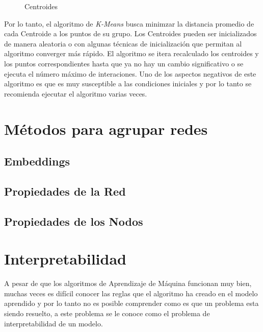  \begin{figure}[htbp]
   \centering
   
    \caption{Centroides}
    \label{fig:cengroides}
\end{figure}

Por lo tanto, el algoritmo de \textit{K-Means} busca minimzar la distancia promedio de cada Centroide a los puntos de su grupo. Los Centroides pueden ser inicializados de manera aleatoria o con algunas técnicas de inicialización que permitan al algoritmo converger más rápido. El algoritmo se itera recalculado los centroides y los puntos correspondientes hasta que ya no hay un cambio significativo o se ejecuta el número máximo de interaciones. Uno de los aspectos negativos de este algoritmo es que es muy susceptible a las condiciones iniciales y por lo tanto se recomienda ejecutar el algoritmo varias veces.

 

\section{Métodos para agrupar redes}

\subsection{Embeddings}

\subsection{Propiedades de la Red}
\label{sec:related:sec2}

\subsection{Propiedades de los Nodos}
\label{sec:related:sec2}

\section{Interpretabilidad}
\label{sec:related:sec3}

A pesar de que los algoritmos de Aprendizaje de Máquina funcionan muy bien, muchas veces es difícil conocer las reglas que el algoritmo ha creado en el modelo aprendido y por lo tanto no es posible comprender como es que un problema esta siendo resuelto, a este problema se le conoce como el problema de interpretabilidad de un modelo. \cite{rebala_introduction_2019} 

